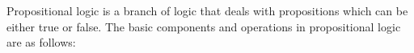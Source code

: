 
\cite{youtube:COSE419-Lecture4-1}

Propositional logic is a branch of logic that deals with propositions which can be either true or false. The basic components and operations in propositional logic are as follows:

%
%

